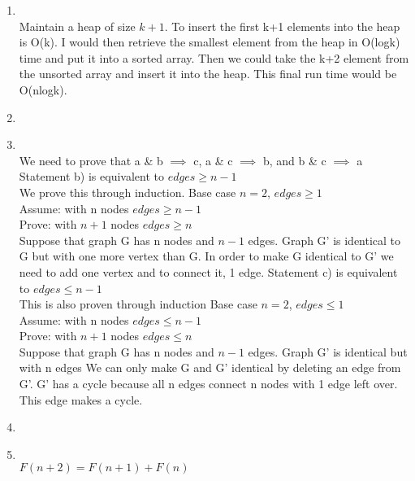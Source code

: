 \documentclass[11pt]{article}
\begin{document}
\begin{enumerate}
            \item \\
            Maintain a heap of size $k+1$.  To insert the first k+1 elements into the heap is O(k).
            I would then retrieve the smallest element from the heap in O(logk) time and put it into
            a sorted array.  Then we could take the k+2 element from the unsorted array and insert it
            into the heap.  This final run time would be O(nlogk).
            \item \\
            \item \\
            We need to prove that a \& b $\implies$ c, a \& c $\implies$ b, and b \& c $\implies$ a\\
            \newline
            Statement b) is equivalent to $edges\geq n-1$\\
            We prove this through induction.  Base case $n=2$, $edges\geq1$\\
            Assume: with n nodes $edges\geq n-1$\\
            Prove: with $n+1$ nodes $edges\geq n$\\
            Suppose that graph G has n nodes and $n-1$ edges.  Graph G' is identical to G but with
            one more vertex than G.  In order to make G identical to G' we need to add one vertex and
            to connect it, 1 edge.
            \newline
            \newline
            Statement c) is equivalent to $edges\leq n-1$\\
            This is also proven through induction
            Base case $n=2$, $edges\leq1$\\
            Assume: with n nodes $edges\leq n-1$\\
            Prove: with $n+1$ nodes $edges\leq n$\\
            Suppose that graph G has n nodes and $n-1$ edges.  Graph G' is identical but with n edges
            We can only make G and G' identical by deleting an edge from G'.  G' has a cycle because all
            n edges connect n nodes with 1 edge left over.  This edge makes a cycle.
            \item \\
            \item \\
            $F(n+2) = F(n+1) + F(n)$\\

\end{enumerate}
\end{document}
